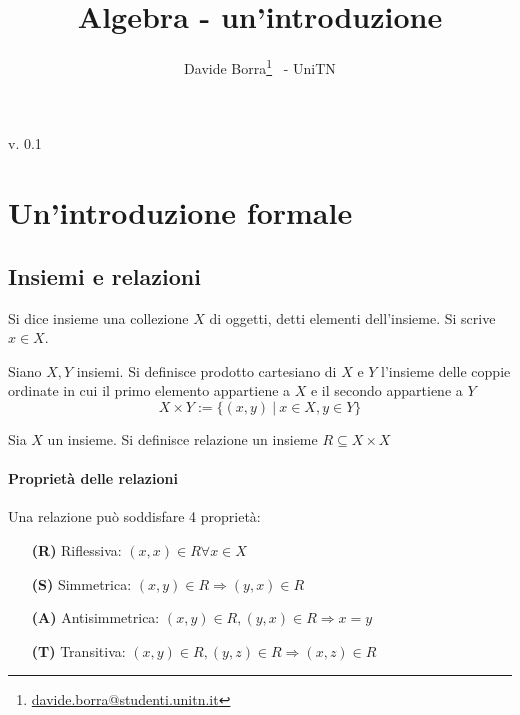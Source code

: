 \documentclass{article}     %
\title{Algebra - un'introduzione}
\author{Davide Borra\footnote{\href{mailto:davide.borra@studenti.unitn.it}{davide.borra@studenti.unitn.it}} ~- UniTN}
\begin{document}
\begin{titlepage}
    \maketitle
    \tableofcontents
    \vspace{\fill}
    \hspace{\fill} v. 0.1   %
\end{titlepage}

\chead{}
\section{Un'introduzione formale}
\subsection{Insiemi e relazioni}
\begin{shaded}
    \begin{definition}[Insieme]
        Si dice insieme una collezione $X$ di oggetti, detti elementi dell'insieme. Si scrive $x\in X$.
    \end{definition}
\end{shaded}
\begin{shaded}
    \begin{definition}
    Siano $X, Y$ insiemi. Si definisce prodotto cartesiano di $X$ e $Y$ l'insieme delle coppie ordinate in cui il primo elemento appartiene a $X$ e il secondo appartiene a $Y$ \[X\times Y:=\{(x,y)\:|\: x\in X, y\in Y \}\]
\end{definition}
\end{shaded}
\begin{shaded}
    \begin{definition}[Relazione]
        Sia $X$ un insieme. Si definisce relazione un insieme $R\subseteq X\times X$
    \end{definition}
\end{shaded}
\paragraph{Proprietà delle relazioni}
Una relazione può soddisfare 4 proprietà:
\begin{enumerate}
    \item[\textbf{(R)}] Riflessiva: $(x,x)\in R\forall x\in X$
    \item[\textbf{(S)}] Simmetrica: $(x,y)\in R \Rightarrow (y,x)\in R$
    \item[\textbf{(A)}] Antisimmetrica: $(x,y) \in R, (y,x)\in R \Rightarrow x=y$
    \item[\textbf{(T)}] Transitiva: $(x,y)\in R,(y,z)\in R\Rightarrow (x,z)\in R$
\end{enumerate}
\end{document}
